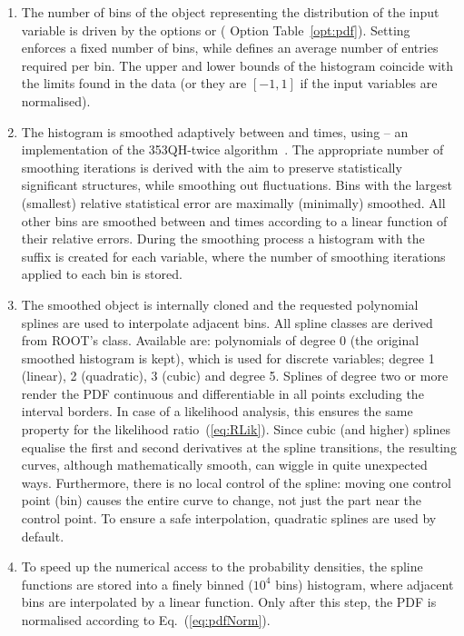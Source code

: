 \begin{enumerate}
\item	The number of bins of the  object representing the distribution of the 
      input variable is driven by the options  or  (\cf
      Option Table~\ref{opt:pdf}). Setting  enforces a fixed number 
		of bins, while  defines an average number of entries required 
 		per bin. The upper and lower bounds of the histogram coincide with the limits found 
      in the data (or they are $[-1,1]$ if the input variables are normalised).

\item	The histogram is smoothed adaptively between  
      and  times, using  -- an implementation of 
      the 353QH-twice algorithm~\cite{353qh}. The appropriate number of smoothing 
      iterations is derived with the aim to preserve statistically significant structures,
      while smoothing out fluctuations. Bins with the largest (smallest) relative statistical 
      error are maximally (minimally) smoothed. All other bins are smoothed between  
      and  times according to a linear function of their relative 
      errors. During the smoothing process a histogram with the suffix  is 
      created for each variable, where the number of smoothing iterations applied to each 
      bin is stored.

\item	The smoothed  object is internally cloned and the requested polynomial splines
      are used to interpolate adjacent bins. All spline classes are derived from ROOT's 
       class. Available are: polynomials of degree 0 (the original smoothed 
      histogram is kept), which is used for discrete variables; degree 1 (linear), 
      2 (quadratic), 3 (cubic) and degree 5. Splines of degree two or more 
      render the PDF continuous and differentiable in all points excluding the interval 
      borders. In case of a likelihood analysis, this ensures the same property for the 
		likelihood ratio~(\ref{eq:RLik}). Since cubic (and higher) splines equalise
		the first and second derivatives at the spline transitions, the 
		resulting curves, although mathematically smooth, can wiggle in
		quite unexpected ways. Furthermore, there is no local control of 
		the spline: moving one control point (bin) causes the entire curve 
		to change, not just the part near the control point. To ensure 
		a safe interpolation, quadratic splines are used by default.
		
\item To speed up the numerical access to the probability densities,
		the spline functions are stored into a finely binned ($10^4$ bins)
		histogram, where adjacent bins are interpolated by a linear
		function. Only after this step, the PDF is normalised according
		to Eq.~(\ref{eq:pdfNorm}).

\end{enumerate}

